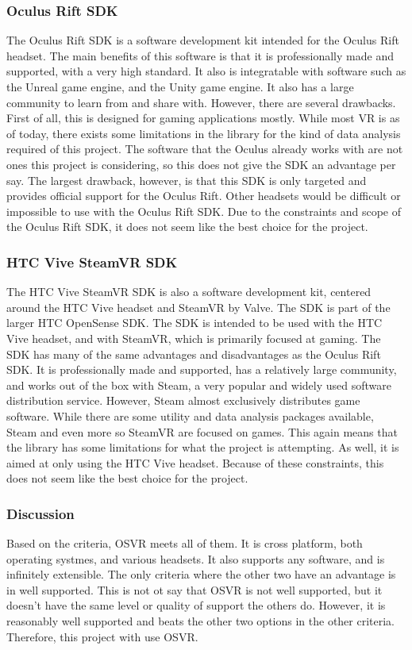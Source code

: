 \subsubsection{Oculus Rift SDK} 

The Oculus Rift SDK is a software development kit intended for the Oculus Rift headset.
The main benefits of this software is that it is professionally made and supported, with
a very high standard. It also is integratable with software such as the Unreal game engine,
and the Unity game engine. It also has a large community to learn from and share with. However,
there are several drawbacks. First of all, this is designed for gaming applications mostly. While most
VR is as of today, there exists some limitations in the library for the kind of data analysis required of
this project. The software that the Oculus already works with are not ones this project is considering,
so this does not give the SDK an advantage per say. The largest drawback, however, 
is that this SDK is only targeted and provides official support for the Oculus Rift. 
Other headsets would be difficult or impossible to use with the Oculus Rift SDK.
Due to the constraints and scope of the Oculus Rift SDK, it does not seem like the best choice for the
project. 


\subsubsection{HTC Vive SteamVR SDK}

The HTC Vive SteamVR SDK is also a software development kit, centered around the HTC Vive headset
and SteamVR by Valve. The SDK is part of the larger HTC OpenSense SDK. The SDK is intended to be used
with the HTC Vive headset, and with SteamVR, which is primarily focused at gaming. The SDK has many
of the same advantages and disadvantages as the Oculus Rift SDK. It is professionally made and supported,
has a relatively large community, and works out of the box with Steam, a very popular and widely used
software distribution service. However, Steam almost exclusively distributes game software. While there
are some utility and data analysis packages available, Steam and even more so SteamVR are focused on
games. This again means that the library has some limitations for what the project is attempting. As well,
it is aimed at only using the HTC Vive headset. Because of these constraints, this does not seem like the
best choice for the project. 

\subsubsection{Discussion}
Based on the criteria, OSVR meets all of them. It is cross platform, both operating systmes, and
various headsets. It also supports any software, and is infinitely extensible. The only criteria
where the other two have an advantage is in well supported. This is not ot say that OSVR is not
well supported, but it doesn't have the same level or quality of support the others do. However,
it is reasonably well supported and beats the other two options in the other criteria. Therefore,
this project with use OSVR.

